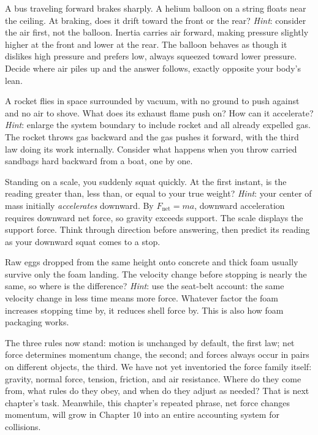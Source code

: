 \begin{puzzles}
\item A bus traveling forward brakes sharply. A helium balloon on a string floats near the ceiling. At braking, does it drift toward the front or the rear? \emph{Hint}: consider the air first, not the balloon. Inertia carries air forward, making pressure slightly higher at the front and lower at the rear. The balloon behaves as though it dislikes high pressure and prefers low, always squeezed toward lower pressure. Decide where air piles up and the answer follows, exactly opposite your body's lean.
\item A rocket flies in space surrounded by vacuum, with no ground to push against and no air to shove. What does its exhaust flame push on? How can it accelerate? \emph{Hint}: enlarge the system boundary to include rocket and all already expelled gas. The rocket throws gas backward and the gas pushes it forward, with the third law doing its work internally. Consider what happens when you throw carried sandbags hard backward from a boat, one by one.
\item Standing on a scale, you suddenly squat quickly. At the first instant, is the reading greater than, less than, or equal to your true weight? \emph{Hint}: your center of mass initially \emph{accelerates} downward. By \(F_{\text{net}}=ma\), downward acceleration requires downward net force, so gravity exceeds support. The scale displays the support force. Think through direction before answering, then predict its reading as your downward squat comes to a stop.
\item Raw eggs dropped from the same height onto concrete and thick foam usually survive only the foam landing. The velocity change before stopping is nearly the same, so where is the difference? \emph{Hint}: use the seat-belt account: the same velocity change in less time means more force. Whatever factor the foam increases stopping time by, it reduces shell force by. This is also how foam packaging works.
\end{puzzles}

The three rules now stand: motion is unchanged by default, the first law; net force determines momentum change, the second; and forces always occur in pairs on different objects, the third. We have not yet inventoried the force family itself: gravity, normal force, tension, friction, and air resistance. Where do they come from, what rules do they obey, and when do they adjust as needed? That is next chapter's task. Meanwhile, this chapter's repeated phrase, net force changes momentum, will grow in Chapter 10 into an entire accounting system for collisions.
